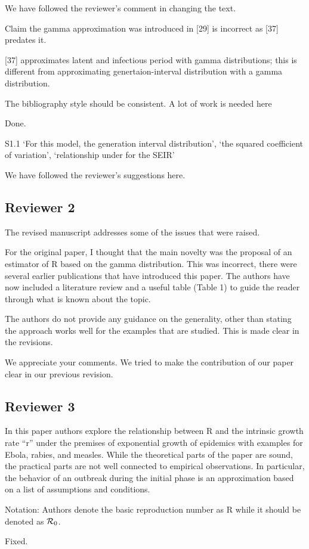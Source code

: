 \documentclass[12pt]{article}
\newcommand{\Rx}[1]{\ensuremath{{\cal R}_{#1}}}
\newcommand{\Ro}{\Rx{0}}
\newcommand{\rev}{\subsection*}
\newcommand{\revtext}{\textsf}
\begin{document}
We have followed the reviewer's comment in changing the text.

\revtext{Claim the gamma approximation was introduced in [29] is incorrect as [37] predates it.}

[37] approximates latent and infectious period with gamma distributions; this is different from approximating genertaion-interval distribution with a gamma distribution.

\revtext{The bibliography style should be consistent. A lot of work is needed here}

Done.

\revtext{S1.1 ‘For this model, the generation interval distribution’, ‘the squared coefficient of variation’, ‘relationship under for the SEIR’}

We have followed the reviewer's suggestions here. 

\rev{Reviewer 2}

\revtext{The revised manuscript addresses some of the issues that were raised.}

\revtext{For the original paper, I thought that the main novelty was the
proposal of an estimator of R based on the gamma distribution. This
was incorrect, there were several earlier publications that have
introduced this paper. The authors have now included a literature
review and a useful table (Table 1) to guide the reader through what
is known about the topic.}

\revtext{The authors do not provide any guidance on the generality, other than
stating the approach works well for the examples that are studied.
This is made clear in the revisions.}

We appreciate your comments. We tried to make the contribution of our paper clear in our previous revision.

\rev{Reviewer 3}

\revtext{In this paper authors explore the relationship between R and the
intrinsic growth rate ``r'' under the premises of exponential growth of
epidemics with examples for Ebola, rabies, and measles. While the
theoretical parts of the paper are sound, the practical parts are not
well connected to empirical observations. In particular, the behavior
of an outbreak during the initial phase is an approximation based on a
list of assumptions and conditions.}

\revtext{Notation: Authors denote the basic reproduction number as R while it should be denoted as \Ro.}

Fixed.
\end{document}
